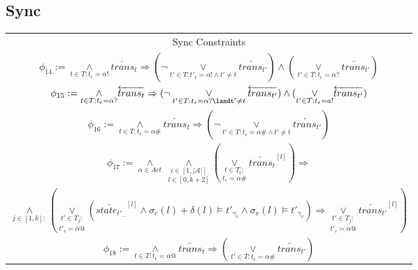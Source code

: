 \documentclass[a4paper,12pt]{article}
\begin{document}
\subsection{Sync}
\label{sec:orgff0592e}
\begin{center}
\begin{tabular}{c}
Sync Constraints \\
\(\phi_{14} := \underset{t \in T: t_\epsilon = \alpha!}{\land} \overleftarrow{trans_t} \Rightarrow (\neg \underset{t' \in T: t'_\epsilon = \alpha!\land t'\neq t}{\lor} \overleftarrow{trans_{t'}}) \land (\underset{t' \in T: t_\epsilon = \alpha?}{\lor} \overleftarrow{trans_{t'}})\) \\
\midrule
\(\phi_{15} := \underset{t \in T: t_\epsilon = \alpha?}{\land} \overleftarrow{trans_t} \Rightarrow (\neg \underset{t' \in T:t_\epsilon = \alpha?\landt'\neq t}{\lor} \overleftarrow{trans_{t'}}) \land (\underset{t' \in T:t_\epsilon = a!}{\lor} \overleftarrow{trans_{t'}})\) \\
\midrule
\(\phi_{16} := \underset{t \in T:t_\epsilon = \alpha\#}{\land} \overleftarrow{trans_t} \Rightarrow (\neg \underset{t' \in T:t_\epsilon = \alpha\#\land t' \neq t}{\lor} \overleftarrow{trans_{t'}}) \) \\
\midrule
\(\phi_{17} := \underset{\alpha \in Act}{\land}\ \underset{l \in [0,k+2]}{\underset{i \in [1,|\mathcal{A}|]}{\land}} (\underset{t_\epsilon = \alpha\#}{\underset{t \in T_i:}{\lor}} \overleftarrow{trans_t}^{[l]}) \Rightarrow \) \\
\(\underset{}{\underset{j \in [1,k]:}{\land}} (\underset{t'_\epsilon = \alpha@}{\underset{t' \in T_j: }{\lor}} (\overleftarrow{state_{t'_-}}^{[l]} \land \sigma_c(l) + \delta(l) \vDash t'_{\gamma_c} \land \sigma_v(l) \vDash t'_{\gamma_v}) \Rightarrow \underset{t'_\epsilon = \alpha@}{\underset{t' \in T_j:}{\lor}} \overleftarrow{trans_{t'}}^{[l]}) \) \\
\midrule
\(\phi_{18} := \underset{t \in T:t_\epsilon = \alpha@}{\land} \overleftarrow{trans_t} \Rightarrow (\underset{t' \in T: t_\epsilon = \alpha\#}{\lor} \overleftarrow{trans_{t'}}) \) \\

\end{tabular}
\end{center}
\end{document}
